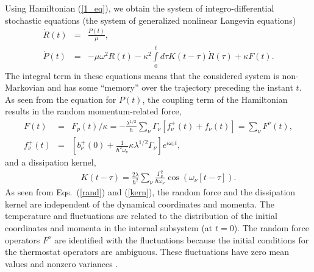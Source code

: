 \documentclass[preprint,review,12pt]{elsarticle}
\begin{document}
  Using Hamiltonian (\ref{1_eq}), we obtain the system of integro-differential stochastic equations
  (the system of generalized nonlinear Langevin equations) \cite{VAZ}
  \begin{eqnarray}
  \dot R(t)&=&\frac{P(t)}{\mu},\nonumber\\
  \dot P(t)&=&-\mu \omega^2 R(t) - \kappa^2\int\limits_{0}^{t}d\tau K(t-\tau)\dot R(\tau) + \kappa F(t).
  \label{4_eq}
  \end{eqnarray}
  The integral term in these equations
  means that the considered system is non-Markovian and has some “memory” over the trajectory
  preceding the instant $t$. As seen from the equation for $P(t)$, the coupling term of the Hamiltonian
  results in the random momentum-related force,
  \begin{eqnarray}
  F(t)&=&F_p(t)/\kappa=-\frac{\lambda^{1/2}}{\hbar}\sum_{\nu}^{}
  \Gamma_\nu[f_\nu^{+}(t)+f_\nu(t)]=\sum_{\nu}^{}F^{\nu}(t),\nonumber\\
  f_\nu^+(t)&=&[b_\nu^+(0)+\frac{1}{\hbar^2\omega_\nu}\kappa\lambda^{1/2}\Gamma_\nu]e^{i\omega_\nu t},
  \label{rand}
  \end{eqnarray}
  and a dissipation kernel,
  \begin{eqnarray}
  K(t-\tau)=\frac{2\lambda}{\hbar^2}\sum_{\nu}^{}
  \frac{\Gamma_\nu^2}{\hbar\omega_\nu}\cos(\omega_\nu[t-\tau]).
  \label{kern}
  \end{eqnarray}
  As seen from Eqs.~(\ref{rand}) and (\ref{kern}), the random force and the dissipation kernel are independent
  of the dynamical coordinates and momenta. The temperature and fluctuations are related to
  the distribution of the initial coordinates and momenta in the internal subsystem (at $t = 0$).
  The random force operators $F^{\nu}$ are identified with the fluctuations
  because the initial conditions for the thermostat operators are ambiguous.
  These fluctuations have zero mean values and nonzero variances \cite{Katia}.
\end{document}
